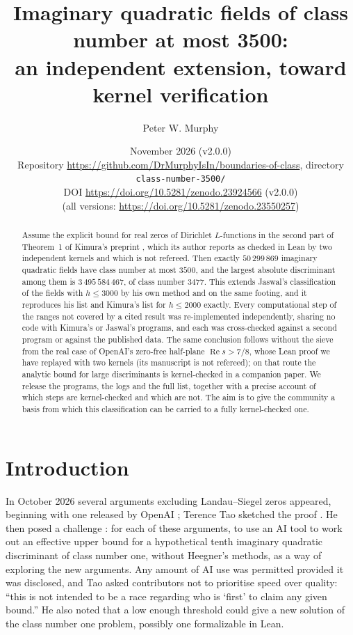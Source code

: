 \documentclass[11pt]{article}
\title{Imaginary quadratic fields of class number at most 3500:\\ an independent extension, toward kernel verification}
\author{Peter W. Murphy}
\date{November 2026 (v2.0.0)\\[2pt] \small Repository \url{https://github.com/DrMurphyIsIn/boundaries-of-class}, directory \texttt{class-number-3500/}\\ \small DOI \url{https://doi.org/10.5281/zenodo.23924566} (v2.0.0)\\ \small (all versions: \url{https://doi.org/10.5281/zenodo.23550257})}
\theoremstyle{definition}
\begin{document}
\maketitle

\begin{abstract}
Assume the explicit bound for real zeros of Dirichlet $L$-functions in the second part of Theorem~1 of Kimura's preprint
\cite{Kimura2026}, which its author reports as checked in Lean by two independent kernels and which is not
refereed. Then exactly $50\,299\,869$
imaginary quadratic fields have class number at most $3500$, and the largest absolute discriminant among them is
$3\,495\,584\,467$, of class number $3477$. This extends Jaswal's classification of the fields with $h \le 3000$
\cite{Jaswal2026} by his own method and on the same footing, and it reproduces his list and Kimura's list for
$h \le 2000$ exactly. Every computational step of the ranges not covered by a cited result was re-implemented independently,
sharing no code with Kimura's or Jaswal's programs, and each was cross-checked against a second program or against the
published data. The same conclusion follows without the sieve from the real case of OpenAI's zero-free half-plane
$\operatorname{Re} s > 7/8$, whose Lean proof we have replayed with two kernels (its manuscript is not refereed); on
that route the analytic bound for large discriminants is kernel-checked in a companion paper. We release the
programs, the logs and the full list, together with a precise account of which steps are kernel-checked and which are not. The aim is to give the
community a basis from which this classification can be carried to a fully kernel-checked one.
\end{abstract}

\section{Introduction}

In October 2026 several arguments excluding Landau--Siegel zeros appeared, beginning with one released by OpenAI
\cite{OpenAISZ}; Terence Tao sketched the proof \cite{TaoSketch}. He then posed a challenge \cite{TaoChallenge}: for each
of these arguments, to use an AI tool to work out an effective upper bound for a hypothetical tenth imaginary quadratic
discriminant of class number one, without Heegner's methods, as a way of exploring the new arguments. Any amount of AI use
was permitted provided it was disclosed, and Tao asked contributors not to prioritise speed over quality: ``this is not
intended to be a race regarding who is `first' to claim any given bound.'' He also noted that a low enough threshold could
give a new solution of the class number one problem, possibly one formalizable in Lean.
\end{document}
